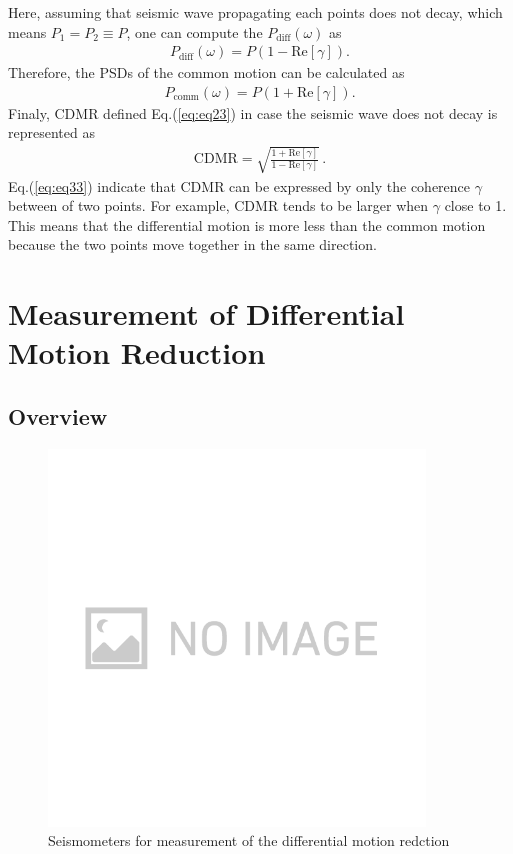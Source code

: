 Here, assuming that seismic wave propagating each points does not decay, which means $P_{1}=P_{2} \equiv P$, one can compute the $P_{\mathrm{diff}}(\omega)$ as 
\begin{eqnarray}
  P_{\mathrm{diff}}(\omega) = P (1-\mathrm{Re}\left[\gamma\right]).
\end{eqnarray}
Therefore, the PSDs of the common motion can be calculated as
\begin{eqnarray}
  P_{\mathrm{comm}}(\omega) = P (1+\mathrm{Re}\left[\gamma\right]).
\end{eqnarray}
Finaly, CDMR defined Eq.(\ref{eq:eq23}) in case the seismic wave does not decay is represented as
\begin{eqnarray}
 \mathrm{CDMR} = \sqrt{\frac{1 + \mathrm{Re} \left[\gamma \right] }{1 - \mathrm{Re} \left[\gamma \right]}}\,. \label{eq:eq33}
\end{eqnarray}
Eq.(\ref{eq:eq33}) indicate that CDMR can be expressed by only the coherence $\gamma$ between of two points. For example, CDMR tends to be larger when $\gamma$ close to 1. This means that the differential motion is more less than the common motion because the two points move together in the same direction.

\section{Measurement of Differential Motion Reduction}
\subsection{Overview}

\begin{figure}[H]
  \begin{center}   
    \includegraphics[width=10.0cm]{./img_chap3/img318.png}
    \caption{Seismometers for measurement of the differential motion redction}\label{img:img318}
  \end{center}
\end{figure}


